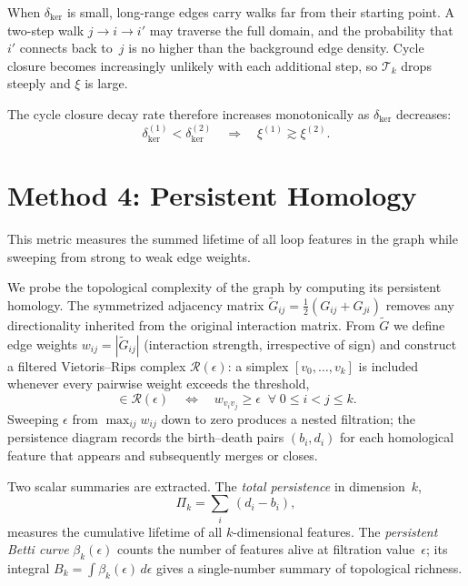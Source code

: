 \documentclass[11pt]{article}
\begin{document}
When $\delta_{\mathrm{ker}}$ is small, long-range edges carry walks
far from their starting point.  A two-step walk $j\to i\to i'$ may
traverse the full domain, and the probability that $i'$ connects back
to~$j$ is no higher than the background edge density.  Cycle closure
becomes increasingly unlikely with each additional step, so
$\mathcal{T}_k$ drops steeply and $\xi$ is large.

The cycle closure decay rate therefore increases monotonically as
$\delta_{\mathrm{ker}}$ decreases:
\begin{equation}
  \delta_{\mathrm{ker}}^{(1)} < \delta_{\mathrm{ker}}^{(2)}
  \quad\Longrightarrow\quad
  \xi^{(1)} \gtrsim \xi^{(2)}.
  \label{eq:xi_monotone}
\end{equation}

\section{Method 4: Persistent Homology}
\label{sec:persistent_homology}

This metric measures the summed lifetime of all loop features in the graph while sweeping from strong to weak edge weights.

We probe the topological complexity of the graph by computing its
persistent homology.  The symmetrized adjacency matrix
$\tilde{G}_{ij}=\tfrac{1}{2}(G_{ij}+G_{ji})$ removes any
directionality inherited from the original interaction matrix.  From
$\tilde{G}$ we define edge weights $w_{ij}=|\tilde{G}_{ij}|$
(interaction strength, irrespective of sign) and construct a filtered
Vietoris--Rips complex $\mathcal{R}(\epsilon)$: a simplex
$[v_0,\dots,v_k]$ is included whenever every pairwise weight exceeds
the threshold,
\begin{equation}
  [v_0,\dots,v_k]\in\mathcal{R}(\epsilon)
  \quad\Longleftrightarrow\quad
  w_{v_i v_j}\geq\epsilon
  \;\;\forall\;0\leq i<j\leq k.
  \label{eq:rips}
\end{equation}
Sweeping $\epsilon$ from $\max_{ij}w_{ij}$ down to zero produces a
nested filtration; the persistence diagram records the birth--death
pairs $(b_i,d_i)$ for each homological feature that appears and
subsequently merges or closes.

Two scalar summaries are extracted.  The \emph{total persistence} in
dimension~$k$,
\begin{equation}
  \Pi_k = \sum_{i}\,(d_i - b_i),
  \label{eq:total_persistence}
\end{equation}
measures the cumulative lifetime of all $k$-dimensional features.
The \emph{persistent Betti curve} $\beta_k(\epsilon)$ counts the
number of features alive at filtration value~$\epsilon$; its integral
$B_k = \int \beta_k(\epsilon)\,d\epsilon$ gives a single-number
summary of topological richness.
\end{document}
